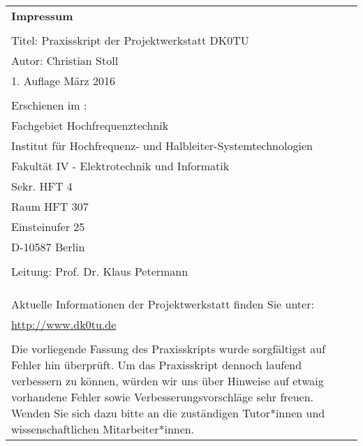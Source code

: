 \thispagestyle{empty}

\begin{tabular}{p{13cm} p{1cm}}
\textbf{Impressum} &\\
&\\
Titel: Praxisskript der Projektwerkstatt DK0TU&\\
Autor: Christian Stoll&\\
1. Auflage März 2016 &\\
&\\
Erschienen im :&\\
Fachgebiet Hochfrequenztechnik &\\
Institut für Hochfrequenz- und Halbleiter-Systemtechnologien&\\
Fakultät IV - Elektrotechnik und Informatik &\\
Sekr. HFT 4 &\\
Raum HFT 307 &\\
Einsteinufer 25 &\\
D-10587 Berlin &\\
&\\
Leitung: Prof. Dr. Klaus Petermann &\\
&\\
&\\
&\\
Aktuelle Informationen der Projektwerkstatt finden Sie unter:  &\\
\url{http://www.dk0tu.de} &\\
&\\
Die vorliegende Fassung des Praxisskripts wurde sorgfältigst auf Fehler hin überprüft. Um das Praxisskript dennoch laufend verbessern zu können, würden wir uns über Hinweise auf etwaig vorhandene Fehler sowie Verbesserungsvorschläge sehr freuen. Wenden Sie sich dazu bitte an die zuständigen Tutor*innen und wissenschaftlichen Mitarbeiter*innen.&\\
\end{tabular}



